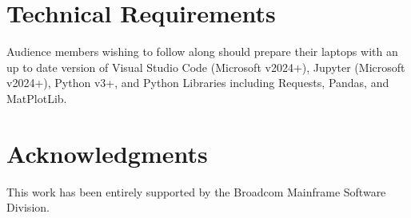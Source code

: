 \documentclass[a4paper]{article}
\begin{document}
\section{Technical Requirements}
    Audience members wishing to follow along should prepare their laptops with an up to date version of Visual Studio Code (Microsoft v2024+), Jupyter (Microsoft v2024+), Python v3+, and Python Libraries including Requests, Pandas, and MatPlotLib.


\section{Acknowledgments}
    This work has been entirely supported by the Broadcom Mainframe Software Division.

\end{document}
